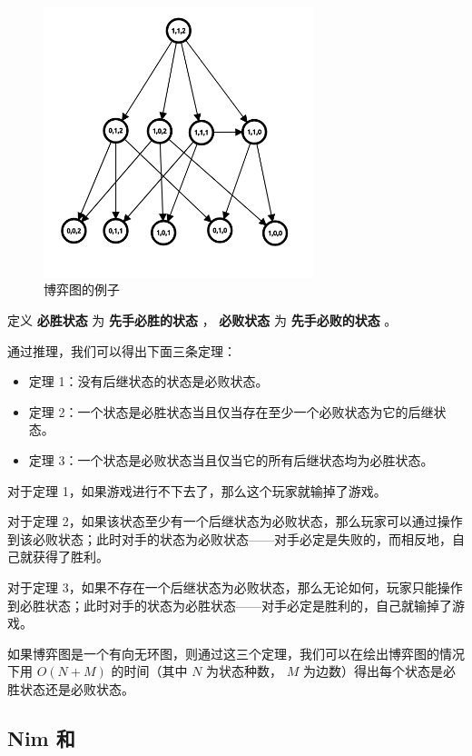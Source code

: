 \begin{figure}[htbp]
\centering
\includegraphics[width=0.7\textwidth]{docs/math/images/game1.png} 
\caption{博弈图的例子}
\end{figure}

定义 \textbf{ 必胜状态 } 为 \textbf{ 先手必胜的状态 }，\textbf{ 必败状态 } 为 \textbf{ 先手必败的状态 }。

通过推理，我们可以得出下面三条定理：

\begin{itemize}
\item 定理 1：没有后继状态的状态是必败状态。
\item 定理 2：一个状态是必胜状态当且仅当存在至少一个必败状态为它的后继状态。
\item 定理 3：一个状态是必败状态当且仅当它的所有后继状态均为必胜状态。
\end{itemize}

对于定理 1，如果游戏进行不下去了，那么这个玩家就输掉了游戏。

对于定理 2，如果该状态至少有一个后继状态为必败状态，那么玩家可以通过操作到该必败状态；此时对手的状态为必败状态——对手必定是失败的，而相反地，自己就获得了胜利。

对于定理 3，如果不存在一个后继状态为必败状态，那么无论如何，玩家只能操作到必胜状态；此时对手的状态为必胜状态——对手必定是胜利的，自己就输掉了游戏。

如果博弈图是一个有向无环图，则通过这三个定理，我们可以在绘出博弈图的情况下用 $O(N+M)$ 的时间（其中 $N$ 为状态种数， $M$ 为边数）得出每个状态是必胜状态还是必败状态。

\subsection{Nim 和}

